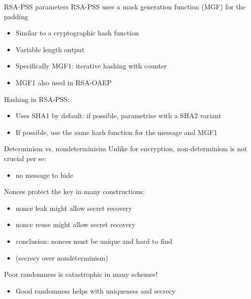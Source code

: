 \begin{frame}{RSA-PSS parameters}
  RSA-PSS uses a mask generation function (MGF) for the padding
  \begin{itemize}[<+(1)->]
    \item Similar to a cryptographic hash function
    \item Variable length output
    \item Specifically MGF1: iterative hashing with counter
    \item MGF1 also used in RSA-OAEP
  \end{itemize}

  \vfill

  \pause
  Hashing in RSA-PSS:
  \begin{itemize}[<+(1)->]
    \item Uses SHA1 by default: if possible, parametrise with a SHA2 variant
    \item If possible, use the same hash function for the message and MGF1
  \end{itemize}
\end{frame}

\begin{frame}{Determinism vs. nondeterminisim}
  \pause
  Unlike for encryption, non-determinism is not crucial per se:
  \begin{itemize}[<+(1)->]
    \item no message to hide
  \end{itemize}

  \pause
  Nonces protect the key in many constructions:
  \begin{itemize}[<+(1)->]
    \item nonce leak might allow secret recovery
    \item nonce reuse might allow secret recovery
    \item conclusion: nonces must be unique and hard to find
    \item (secrecy over nondeterminism)
  \end{itemize}

  \pause
  Poor randomness is catastrophic in many schemes!
  \begin{itemize}[<+(1)->]
    \item Good randomness helps with uniqueness and secrecy
  \end{itemize}
\end{frame}

